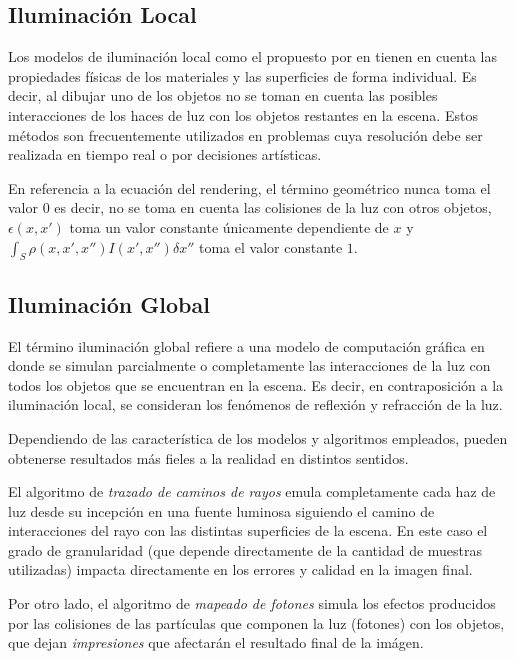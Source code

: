 \subsection{Iluminación Local}
\label{sec:ilumlocal}
Los modelos de iluminación local como el propuesto por \citeauthor{Phong} en \citeyear{Phong} tienen en cuenta las propiedades físicas de los materiales
y las superficies de forma individual. Es decir, al dibujar uno de los objetos no se toman en cuenta las posibles interacciones de los haces de luz con los objetos restantes en la escena. Estos métodos son frecuentemente utilizados en problemas cuya resolución debe ser realizada en tiempo real o por decisiones artísticas.

En referencia a la ecuación del rendering, el término geométrico nunca toma el valor 0 es decir, no se toma en cuenta las colisiones de la luz con otros objetos, $\epsilon(x,x')$ toma un valor constante únicamente dependiente de $x$ y $\int_{S} \rho(x,x',x'')I(x',x'') \delta x''$ toma el valor constante $1$.

\subsection{Iluminación Global}
\label{sec:ilumglobal}

El término iluminación global refiere a una modelo de computación gráfica en donde se simulan parcialmente o completamente las interacciones de la luz con todos los objetos que se encuentran  en la escena. Es decir, en contraposición a la iluminación local, se consideran los fenómenos de reflexión y refracción de la luz.

Dependiendo de las característica de los modelos y algoritmos empleados, pueden obtenerse resultados más fieles a la realidad en distintos sentidos.

El algoritmo de \textit{trazado de caminos de rayos} emula completamente cada haz de luz desde su incepción en una fuente luminosa siguiendo el camino de interacciones del rayo con las distintas superficies de la escena. En este caso el grado de granularidad (que depende directamente de la cantidad de muestras utilizadas) impacta directamente en los errores y calidad en la imagen final.

Por otro lado, el algoritmo de \textit{mapeado de fotones} simula los efectos producidos por las colisiones de las partículas que componen la luz (fotones) con los objetos, que dejan \textit{impresiones} que afectarán el resultado final de la imágen.

